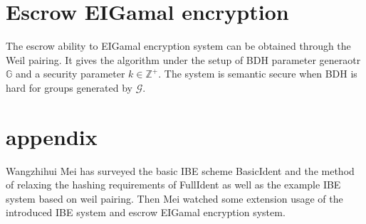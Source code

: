 \documentclass[runningheads,a4paper]{llncs}
\begin{document}
\section {Escrow EIGamal encryption}
The escrow ability to EIGamal encryption system can be obtained through the Weil pairing. It gives the algorithm under the setup of BDH parameter generaotr $\mathbb{G}$ and a security parameter $k \in \mathbb{Z}^+$. The system is semantic secure when BDH is hard for groups generated by $\mathcal{G}$.

\section{appendix}
Wangzhihui Mei has surveyed the basic IBE scheme BasicIdent and the method of relaxing the hashing requirements of FullIdent as well as the example IBE system based on weil pairing. Then Mei watched some extension usage of the introduced IBE system and escrow EIGamal encryption system.
\end{document}

